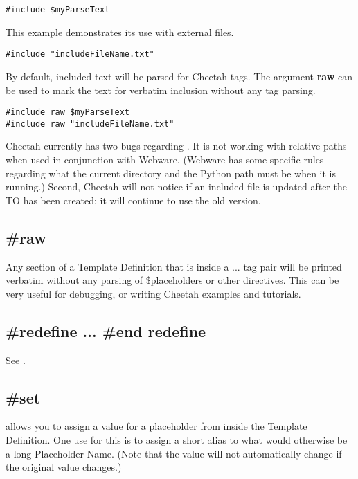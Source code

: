 \begin{verbatim}
#include $myParseText
\end{verbatim}

This example demonstrates its use with external files.
\begin{verbatim}
#include "includeFileName.txt"
\end{verbatim}

By default, included text will be parsed for Cheetah tags.  The argument
{\bf raw} can be used to mark the text for verbatim inclusion without any tag
parsing.

\begin{verbatim}
#include raw $myParseText
#include raw "includeFileName.txt"
\end{verbatim}

Cheetah currently has two bugs regarding .  It is not working
with relative paths when used in conjunction with Webware.  (Webware has some
specific rules regarding what the current directory and the Python path must be
when it is running.)  Second, Cheetah will not notice if an included file is
updated after the TO has been created; it will continue to use the old version.

\subsection{\#raw}
Any section of a Template Definition that is inside a  ...
 tag pair will be printed verbatim without any parsing of
\$placeholders or other directives.  This can be very useful for debugging, or
writing Cheetah examples and tutorials.


\subsection{\#redefine ... \#end redefine}

See .


\subsection{\#set}

 allows you to assign a value for a placeholder from inside the
Template Definition.  One use for this is to assign a short alias to what would
otherwise be a long Placeholder Name.  (Note that the  value will
not automatically change if the original value changes.)

